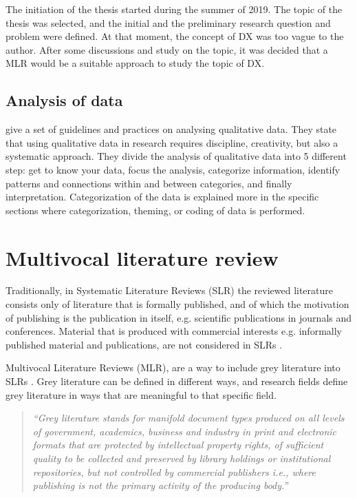 \documentclass[english, 12pt, a4paper, sci, utf8, a-1b, online]{aaltothesis}
\begin{document}
The initiation of the thesis started during the summer of 2019. The topic of the thesis was selected, and the initial and the preliminary research question and problem were defined. At that moment, the concept of DX was too vague to the author. After some discussions and study on the topic, it was decided that a MLR would be a suitable approach to study the topic of DX.

\subsection{Analysis of data}

\textcite{analyzing-qualitative-data} give a set of guidelines and practices on analysing qualitative data. They state that using qualitative data in research requires discipline, creativity, but also a systematic approach. They divide the analysis of qualitative data into 5 different step: get to know your data, focus the analysis, categorize information, identify patterns and connections within and between categories, and finally interpretation. Categorization of the data is explained more in the specific sections where categorization, theming, or coding of data is performed.

\clearpage
\section{Multivocal literature review} \label{section:multivocal-literature-review}

Traditionally, in Systematic Literature Reviews (SLR) the reviewed literature consists only of literature that is formally published, and of which the motivation of publishing is the publication in itself, e.g. scientific publications in journals and conferences. Material that is produced with commercial interests e.g. informally published material and publications, are not considered in SLRs \parencite{guidelines-for-MLR}.

Multivocal Literature Reviews (MLR), are a way to include grey literature into SLRs \parencite{the-need-for-MLR}. Grey literature can be defined in different ways, and research fields define grey literature in ways that are meaningful to that specific field.

\begin{quotation}
  \textit{``Grey literature stands for manifold document types produced on all levels of government, academics, business and industry in print and electronic formats that are protected by intellectual property rights, of sufficient quality to be collected and preserved by library holdings or institutional repositories, but not controlled by commercial publishers i.e., where publishing is not the primary activity of the producing body.''} \parencite{towards-a-prague-definition-of-grey-literature}
\end{quotation}
\end{document}
